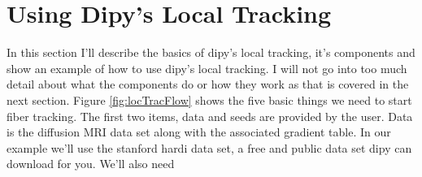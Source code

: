 \section{Using Dipy's Local Tracking}
    In this section I'll describe the basics of dipy's local tracking, it's components and show an example of how to use dipy's local tracking. I will not go into too much detail about what the components do or how they work as that is covered in the next section. Figure \ref{fig:locTracFlow} shows the five basic things we need to start fiber tracking. The first two items, data and seeds are provided by the user. Data is the diffusion MRI data set along with the associated gradient table. In our example we'll use the stanford hardi data set, a free and public data set dipy can download for you. We'll also need 
